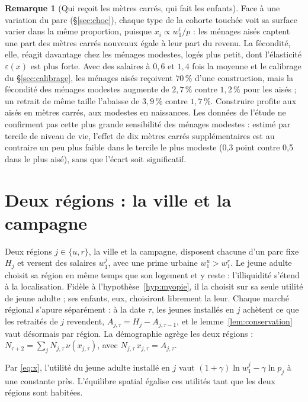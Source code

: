 \documentclass[11pt,a4paper]{article}
\theoremstyle{plain}
\theoremstyle{definition}
\newtheorem{remarque}{Remarque}
\newcommand{\eps}{\varepsilon}
\begin{document}
\begin{remarque}[Qui reçoit les mètres carrés, qui fait les enfants]
Face à une variation du parc (§\ref{sec:choc}), chaque type de la cohorte touchée voit sa surface varier dans la même proportion, puisque $x_i \propto w_1^i/p$ : les ménages aisés captent une part des mètres carrés nouveaux égale à leur part du revenu. La fécondité, elle, réagit davantage chez les ménages modestes, logés plus petit, dont l'élasticité $\eps(x)$ est plus forte. Avec des salaires à $0{,}6$ et $1{,}4$ fois la moyenne et le calibrage du §\ref{sec:calibrage}, les ménages aisés reçoivent $70\,\%$ d'une construction, mais la fécondité des ménages modestes augmente de $2{,}7\,\%$ contre $1{,}2\,\%$ pour les aisés ; un retrait de même taille l'abaisse de $3{,}9\,\%$ contre $1{,}7\,\%$. Construire profite aux aisés en mètres carrés, aux modestes en naissances. Les données de l'étude ne confirment pas cette plus grande sensibilité des ménages modestes : estimé par tercile de niveau de vie, l'effet de dix mètres carrés supplémentaires est au contraire un peu plus faible dans le tercile le plus modeste (0,3 point contre 0,5 dans le plus aisé), sans que l'écart soit significatif.
\end{remarque}

\section{Deux régions : la ville et la campagne}\label{sec:regions}

Deux régions $j \in \{u, r\}$, la ville et la campagne, disposent chacune d'un parc fixe $H_j$ et versent des salaires $w_1^j$, avec une prime urbaine $w_1^u > w_1^r$. Le jeune adulte choisit sa région en même temps que son logement et y reste : l'illiquidité s'étend à la localisation. Fidèle à l'hypothèse~\ref{hyp:myopie}, il la choisit sur sa seule utilité de jeune adulte ; ses enfants, eux, choisiront librement la leur. Chaque marché régional s'apure séparément : à la date $\tau$, les jeunes installés en $j$ achètent ce que les retraités de $j$ revendent, $A_{j,\tau} = H_j - A_{j,\tau-1}$, et le lemme~\ref{lem:conservation} vaut désormais par région. La démographie agrège les deux régions : $N_{\tau+2} = \sum_j N_{j,\tau}\,\nu(x_{j,\tau})$, avec $N_{j,\tau}\,x_{j,\tau} = A_{j,\tau}$.

Par \eqref{eq:x}, l'utilité du jeune adulte installé en $j$ vaut $(1+\gamma)\ln w_1^j - \gamma \ln p_j$ à une constante près. L'équilibre spatial égalise ces utilités tant que les deux régions sont habitées.
\end{document}
